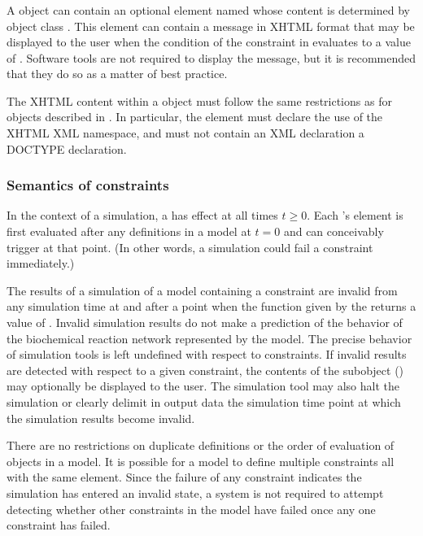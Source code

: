 \subsubsection{}
\label{sec:constraint-message}

A \Constraint object can contain an optional element named
 whose content is determined by object class \Message.
This element can contain a message in XHTML format that may be
displayed to the user when the condition of the constraint in
 evaluates to a value of .  Software tools
are not required to display the message, but it is recommended
that they do so as a matter of best practice.

The XHTML content within a \Message object must follow the same
restrictions as for \Notes objects described in
.  In particular, the element must declare
the use of the XHTML XML namespace, and must not contain an XML
declaration  a DOCTYPE declaration.


\subsubsection{Semantics of constraints}
\label{sec:constraint-semantics}

In the context of a simulation, a \Constraint has effect at all
times $t \geq 0$.  Each \Constraint's  element is first
evaluated after any \InitialAssignment definitions in a model at
$t = 0$ and can conceivably trigger at that point.  (In other
words, a simulation could fail a constraint immediately.)

The results of a simulation of a model containing a constraint are
invalid from any simulation time at and after a point when the
function given by the  returns a value of .
Invalid simulation results do not make a prediction of the
behavior of the biochemical reaction network represented by the
model.  The precise behavior of simulation tools is left undefined
with respect to constraints.  If invalid results are detected with
respect to a given constraint, the contents of the \Message
subobject () may optionally be
displayed to the user.  The simulation tool may also halt the
simulation or clearly delimit in output data the simulation time
point at which the simulation results become invalid.

There are no restrictions on duplicate \Constraint
definitions or the order of evaluation of \Constraint objects in a
model.  It is possible for a model to define multiple constraints
all with the same  element.  Since the failure of any
constraint indicates the simulation has entered an invalid state,
a system is not required to attempt detecting whether
other constraints in the model have failed once any one constraint
has failed.


